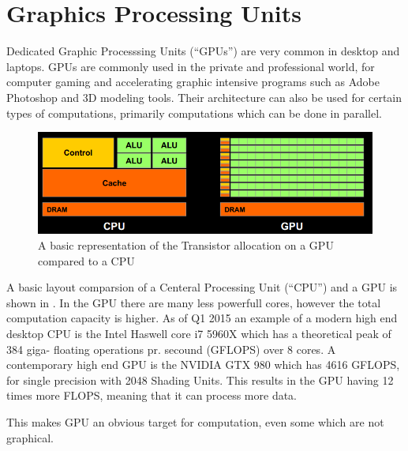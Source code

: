 \section{Graphics Processing Units}
Dedicated Graphic Processsing Units (``GPUs'') are very common in desktop and laptops. \citep{STEAMHW}
GPUs are commonly used in the private and professional world, for computer gaming and accelerating graphic intensive programs such as Adobe Photoshop and 3D modeling tools. \citep{NVIDIAADOBE}
Their architecture can also be used for certain types of computations, primarily computations which can be done in parallel. 

\begin{figure}[h!]
\centering
 \includegraphics[width=1\textwidth]{figures/GPUCPUimage.png} %
\caption{A basic representation of the Transistor allocation on a GPU compared to a CPU}\label{image:GPUCPUimage} %
\vspace{-15pt}
\end{figure}

A basic layout comparsion of a Centeral Processing Unit (``CPU'') and a GPU is shown in .
In the GPU there are many less powerfull cores, however the total computation capacity is higher. 
As of Q1 2015 an example of a modern high end desktop CPU is the Intel Haswell core i7 5960X which has a theoretical peak of 384 giga- floating operations pr. secound (GFLOPS) over 8 cores. \citep{puget}
A contemporary high end GPU is the NVIDIA GTX 980 which has 4616 GFLOPS, for single precision with 2048 Shading Units. \citep{techpowerup}
This results in the GPU having 12 times more FLOPS, meaning that it can process more data. 

This makes GPU an obvious target for computation, even some which are not graphical. %